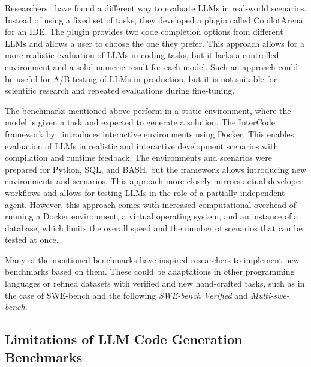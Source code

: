 Researchers~\cite{chi2025copilotarenaplatformcode} have found a different way to evaluate LLMs in real-world scenarios.
Instead of using a fixed set of tasks, they developed a plugin called CopilotArena for an IDE.
The plugin provides two code completion options from different LLMs and allows a user to choose the one they prefer.
This approach allows for a more realistic evaluation of LLMs in coding tasks, but it lacks a controlled environment and a solid numeric result for each model.
Such an approach could be useful for A/B testing of LLMs in production, but it is not suitable for scientific research and repeated evaluations during fine-tuning.

The benchmarks mentioned above perform in a static environment, where the model is given a task and expected to generate a solution.
The InterCode framework by~\cite{yang2023intercodestandardizingbenchmarkinginteractive} introduces interactive environments using Docker.
This enables evaluation of LLMs in realistic and interactive development scenarios with compilation and runtime feedback.
The environments and scenarios were prepared for Python, SQL, and BASH, but the framework allows introducing new environments and scenarios.
This approach more closely mirrors actual developer workflows and allows for testing LLMs in the role of a partially independent agent.
However, this approach comes with increased computational overhead of running a Docker environment, a virtual operating system, and an instance of a database, which limits the overall speed and the number of scenarios that can be tested at once.

Many of the mentioned benchmarks have inspired researchers to implement new benchmarks based on them. These could be adaptations in other programming languages or refined datasets with verified and new hand-crafted tasks, such as in the case of SWE-bench and the following \textit{SWE-bench Verified} and \textit{Multi-swe-bench}.




\subsection{Limitations of LLM Code Generation Benchmarks}

